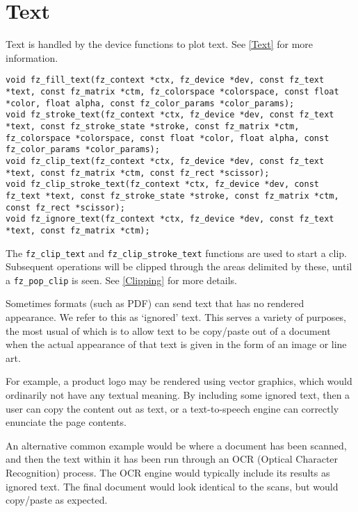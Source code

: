 \documentclass[oneside]{book}
\newcommand{\rjwref}[1] {\autoref{#1} \nameref{#1}}
\begin{document}
\section{Text}
\label{DeviceText}

Text is handled by the device functions to plot text. See \rjwref{Text} for more information.

\begin{lstlisting}
void fz_fill_text(fz_context *ctx, fz_device *dev, const fz_text *text, const fz_matrix *ctm, fz_colorspace *colorspace, const float *color, float alpha, const fz_color_params *color_params);
void fz_stroke_text(fz_context *ctx, fz_device *dev, const fz_text *text, const fz_stroke_state *stroke, const fz_matrix *ctm, fz_colorspace *colorspace, const float *color, float alpha, const fz_color_params *color_params);
void fz_clip_text(fz_context *ctx, fz_device *dev, const fz_text *text, const fz_matrix *ctm, const fz_rect *scissor);
void fz_clip_stroke_text(fz_context *ctx, fz_device *dev, const fz_text *text, const fz_stroke_state *stroke, const fz_matrix *ctm, const fz_rect *scissor);
void fz_ignore_text(fz_context *ctx, fz_device *dev, const fz_text *text, const fz_matrix *ctm);
\end{lstlisting}

The \texttt{fz\_clip\_text} and \texttt{fz\_clip\_stroke\_text} functions are used to start a clip. Subsequent operations will be clipped through the areas delimited by these, until a \texttt{fz\_pop\_clip} is seen. See \rjwref{Clipping} for more details.

Sometimes formats (such as PDF) can send text that has no rendered appearance. We refer to this as `ignored' text. This serves a variety of purposes, the most usual of which is to allow text to be copy/paste out of a document when the actual appearance of that text is given in the form of an image or line art.

For example, a product logo may be rendered using vector graphics, which would ordinarily not have any textual meaning. By including some ignored text, then a user can copy the content out as text, or a text-to-speech engine can correctly enunciate the page contents.

An alternative common example would be where a document has been scanned, and then the text within it has been run through an OCR (Optical Character Recognition) process. The OCR engine would typically include its results as ignored text. The final document would look identical to the scans, but would copy/paste as expected.
\end{document}
